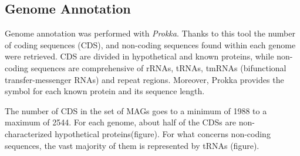 \subsection*{Genome Annotation}
\graphicspath{{images/genomeAnnotation}}


Genome annotation was performed with \textit{Prokka}. Thanks to this tool the number of coding sequences (CDS), and non-coding sequences found within each genome were retrieved. CDS are divided in hypothetical and known proteins, while non-coding sequences are comprehensive of rRNAs, tRNAs, tmRNAs (bifunctional transfer-messenger RNAs) and repeat regions. Moreover, Prokka provides the symbol for each known protein and its sequence length.

The number of CDS in the set of MAGs goes to a minimum of 1988 to a maximum of 2544. For each genome, about half of the CDSs are non-characterized hypothetical proteins(figure). For what concerns non-coding sequences, the vast majority of them is represented by tRNAs (figure).
